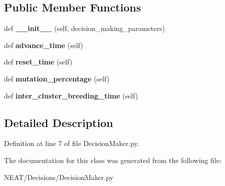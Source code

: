 \subsection*{Public Member Functions}
\begin{DoxyCompactItemize}
\item 
def {\bfseries \+\_\+\+\_\+init\+\_\+\+\_\+} (self, decision\+\_\+making\+\_\+parameters)\hypertarget{class_n_e_a_t___py_genetics_1_1_n_e_a_t_1_1_decisions_1_1_decision_maker_1_1_decision_maker_a7691e28dc58fcd50858edcbf206c5bd9}{}\label{class_n_e_a_t___py_genetics_1_1_n_e_a_t_1_1_decisions_1_1_decision_maker_1_1_decision_maker_a7691e28dc58fcd50858edcbf206c5bd9}

\item 
def {\bfseries advance\+\_\+time} (self)\hypertarget{class_n_e_a_t___py_genetics_1_1_n_e_a_t_1_1_decisions_1_1_decision_maker_1_1_decision_maker_aee1f2396d8dfe5fd8e47f86bf6ffdb84}{}\label{class_n_e_a_t___py_genetics_1_1_n_e_a_t_1_1_decisions_1_1_decision_maker_1_1_decision_maker_aee1f2396d8dfe5fd8e47f86bf6ffdb84}

\item 
def {\bfseries reset\+\_\+time} (self)\hypertarget{class_n_e_a_t___py_genetics_1_1_n_e_a_t_1_1_decisions_1_1_decision_maker_1_1_decision_maker_a18ac18ed4d2954404ea8b58e45b2f176}{}\label{class_n_e_a_t___py_genetics_1_1_n_e_a_t_1_1_decisions_1_1_decision_maker_1_1_decision_maker_a18ac18ed4d2954404ea8b58e45b2f176}

\item 
def {\bfseries mutation\+\_\+percentage} (self)\hypertarget{class_n_e_a_t___py_genetics_1_1_n_e_a_t_1_1_decisions_1_1_decision_maker_1_1_decision_maker_ac441f750aa9b1853744bf49b5e195249}{}\label{class_n_e_a_t___py_genetics_1_1_n_e_a_t_1_1_decisions_1_1_decision_maker_1_1_decision_maker_ac441f750aa9b1853744bf49b5e195249}

\item 
def {\bfseries inter\+\_\+cluster\+\_\+breeding\+\_\+time} (self)\hypertarget{class_n_e_a_t___py_genetics_1_1_n_e_a_t_1_1_decisions_1_1_decision_maker_1_1_decision_maker_ab7cf16b4c29f75b24dec3c6f887b1cea}{}\label{class_n_e_a_t___py_genetics_1_1_n_e_a_t_1_1_decisions_1_1_decision_maker_1_1_decision_maker_ab7cf16b4c29f75b24dec3c6f887b1cea}

\end{DoxyCompactItemize}


\subsection{Detailed Description}


Definition at line 7 of file Decision\+Maker.\+py.



The documentation for this class was generated from the following file\+:\begin{DoxyCompactItemize}
\item 
N\+E\+A\+T/\+Decisions/Decision\+Maker.\+py\end{DoxyCompactItemize}
